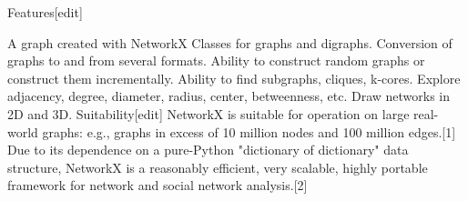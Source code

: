 Features[edit]

A graph created with NetworkX
Classes for graphs and digraphs.
Conversion of graphs to and from several formats.
Ability to construct random graphs or construct them incrementally.
Ability to find subgraphs, cliques, k-cores.
Explore adjacency, degree, diameter, radius, center, betweenness, etc.
Draw networks in 2D and 3D.
Suitability[edit]
NetworkX is suitable for operation on large real-world graphs: e.g., graphs in excess of 10 million nodes and 100 million edges.[1] Due to its dependence on a pure-Python "dictionary of dictionary" data structure, NetworkX is a reasonably efficient, very scalable, highly portable framework for network and social network analysis.[2]
